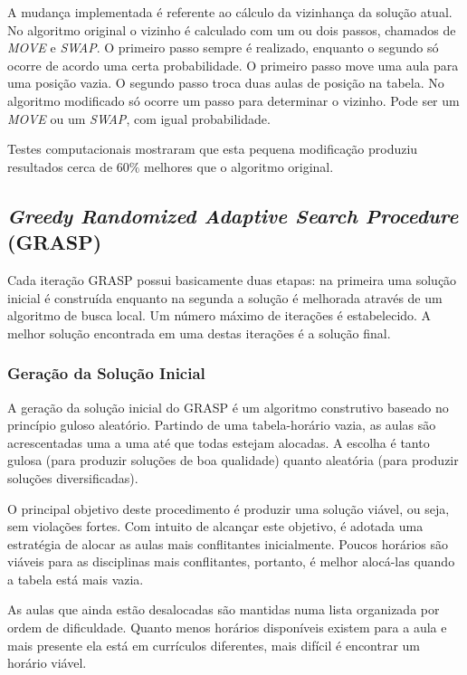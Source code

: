 \documentclass[11pt]{article}
\begin{document}
A mudança implementada é referente ao cálculo da vizinhança da solução atual. No algoritmo original o vizinho é calculado com um ou dois passos, chamados de \textit{MOVE} e \textit{SWAP}. O primeiro passo sempre é realizado, enquanto o segundo só ocorre de acordo uma certa probabilidade. O primeiro passo move uma aula para uma posição vazia. O segundo passo troca duas aulas de posição na tabela. No algoritmo modificado só ocorre um passo para determinar o vizinho. Pode ser um \textit{MOVE} ou um \textit{SWAP}, com igual probabilidade.

Testes computacionais mostraram que esta pequena modificação produziu resultados cerca de $60\%$ melhores que o algoritmo original.

\subsection{\textit{Greedy Randomized Adaptive Search Procedure} (GRASP)}

Cada iteração GRASP \cite{grasp_resende_ribeiro} possui basicamente duas etapas: na primeira uma solução inicial é construída enquanto na segunda a solução é melhorada através de um algoritmo de busca local. Um número máximo de iterações é estabelecido. A melhor solução encontrada em uma destas iterações é a solução final.

\subsubsection{Geração da Solução Inicial}

A geração da solução inicial do GRASP é um algoritmo construtivo baseado no princípio guloso aleatório. Partindo de uma tabela-horário vazia, as aulas são acrescentadas uma a uma até que todas estejam alocadas. A escolha é tanto gulosa (para produzir soluções de boa qualidade) quanto aleatória (para produzir soluções diversificadas).

O principal objetivo deste procedimento é produzir uma solução viável, ou seja, sem violações fortes. Com intuito de alcançar este objetivo, é adotada uma estratégia de alocar as aulas mais conflitantes inicialmente. Poucos horários são viáveis para as disciplinas mais conflitantes, portanto, é melhor alocá-las quando a tabela está mais vazia.

As aulas que ainda estão desalocadas são mantidas numa lista organizada por ordem de dificuldade. Quanto menos horários disponíveis existem para a aula e mais presente ela está em currículos diferentes, mais difícil é encontrar um horário viável.
\end{document}
